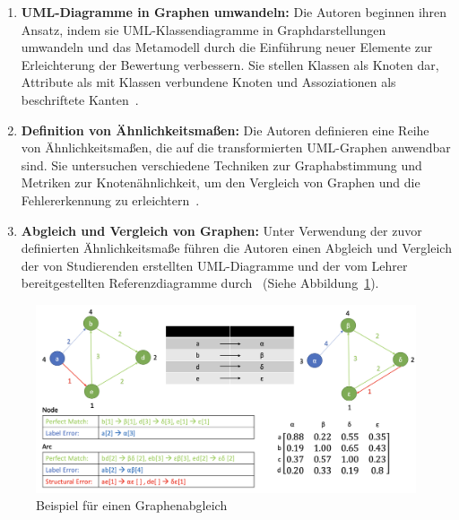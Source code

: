 \begin{enumerate}
    \item \textbf{UML-Diagramme in Graphen umwandeln:} Die Autoren beginnen ihren Ansatz, indem sie UML-Klassendiagramme
    in Graphdarstellungen umwandeln und das Metamodell durch die Einführung neuer Elemente zur Erleichterung der
    Bewertung verbessern. Sie stellen Klassen als Knoten dar, Attribute als mit Klassen verbundene Knoten und
    Assoziationen als beschriftete Kanten~\cite{auxepaules2015diagram}.

    \item \textbf{Definition von Ähnlichkeitsmaßen:} Die Autoren definieren eine Reihe von Ähnlichkeitsmaßen, die auf
    die transformierten UML-Graphen anwendbar sind. Sie untersuchen verschiedene Techniken zur Graphabstimmung und
    Metriken zur Knotenähnlichkeit, um den Vergleich von Graphen und die Fehlererkennung zu erleichtern~\cite{fauzan2018class}.

    \item \textbf{Abgleich und Vergleich von Graphen:} Unter Verwendung der zuvor definierten Ähnlichkeitsmaße führen
    die Autoren einen Abgleich und Vergleich der von Studierenden erstellten UML-Diagramme und der vom Lehrer
    bereitgestellten Referenzdiagramme durch~\cite{outair2017towards} (Siehe Abbildung~\ref{fig:graph-matching}).
\end{enumerate}


\begin{figure}
	\centering
	\includegraphics[width=13cm]{images/graph-matching}
	\caption{Beispiel für einen Graphenabgleich \cite{anas2021new}}
	\label{fig:graph-matching}
\end{figure}

